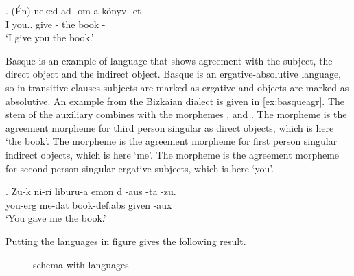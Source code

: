 \exg. (Én) neked ad -om a könyv -et\\
 I you.. give - the book -\\
 `I give you the book.' \label{ex:hungarianagr}

Basque is an example of language that shows agreement with the subject, the direct object and the indirect object. Basque is an ergative-absolutive language, so in transitive clauses subjects are marked as ergative and objects are marked as absolutive. An example from the Bizkaian dialect is given in \ref{ex:basqueagr}. The stem of the auxiliary  combines with the morphemes ,  and . The morpheme  is the agreement morpheme for third person singular as direct objects, which is here  `the book'. The morpheme  is the agreement morpheme for first person singular indirect objects, which is here  `me'. The morpheme  is the agreement morpheme for second person singular ergative subjects, which is here  `you'.

\exg. Zu-k ni-ri liburu-a emon d -aus -ta -zu.\\
 you-\ac{erg} me-\ac{dat} book-\ac{def}.\ac{abs} given  -\ac{aux}  \\
 `You gave me the book.' \label{ex:basqueagr}

Putting the languages in  figure gives the following result.

 \begin{figure}[H]
   \centering
   \caption{ schema with languages}
   \label{fig:agr-sub-do-io-lang}
 \end{figure}

